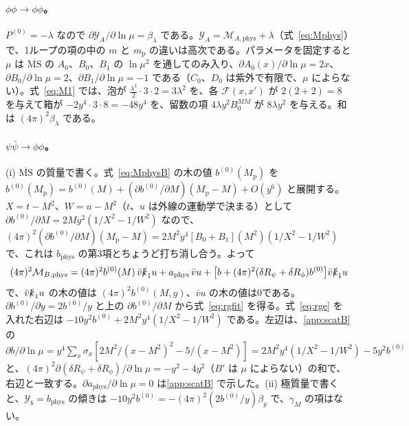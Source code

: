 \documentclass[a4paper,10pt]{ltjsarticle}
\newcommand{\MSbar}{\overline{\mathrm{MS}}}
\begin{document}
\paragraph{$\phi\phi\to\phi\phi$。}$P^{(0)}=-\lambda$ なので $\partial\mathcal Y_A/\partial\ln\mu=\beta_\lambda$ である。$\mathcal Y_A=\mathcal M_{A,\mathrm{phys}}+\lambda$（式~\eqref{eq:Mphys}）で、1ループの項の中の $m$ と $m_{\mathrm p}$ の違いは高次である。パラメータを固定すると $\mu$ は $\MSbar$ の $A_0$、$B_0$、$B_1$ の $\ln\mu^2$ を通してのみ入り、$\partial A_0(x)/\partial\ln\mu=2x$、$\partial B_0/\partial\ln\mu=2$、$\partial B_1/\partial\ln\mu=-1$ である（$C_0$、$D_0$ は紫外で有限で、$\mu$ によらない）。式~\eqref{eq:M1} では、泡が $\frac{\lambda^2}{2}\cdot3\cdot2=3\lambda^2$ を、各 $\mathcal F(x,x')$ が $2(2+2)=8$ を与えて箱が $-2y^4\cdot3\cdot8=-48y^4$ を、留数の項 $4\lambda y^2B_0^{MM}$ が $8\lambda y^2$ を与える。和は $(4\pi)^2\beta_\lambda$ である。

\paragraph{$\psi\bar\psi\to\phi\phi$。}(i) $\MSbar$ の質量で書く。式~\eqref{eq:MphysB} の木の値 $b^{(0)}(M_{\mathrm p})$ を $b^{(0)}(M_{\mathrm p})=b^{(0)}(M)+(\partial b^{(0)}/\partial M)(M_{\mathrm p}-M)+O(y^6)$ と展開する。$X=t-M^2$、$W=u-M^2$（$t$、$u$ は外線の運動学で決まる）として $\partial b^{(0)}/\partial M=2My^2(1/X^2-1/W^2)$ なので、$(4\pi)^2(\partial b^{(0)}/\partial M)(M_{\mathrm p}-M)=2M^2y^4[B_0+B_1](M^2)(1/X^2-1/W^2)$ で、これは $b_{\mathrm{phys}}$ の第3項とちょうど打ち消し合う。よって
\begin{equation*}
(4\pi)^2\mathcal M_{B,\mathrm{phys}}=(4\pi)^2b^{(0)}(M)\,\bar v\slashed k_1u+a_{\mathrm{phys}}\,\bar vu+\bigl[b+(4\pi)^2(\delta R_\psi+\delta R_\phi)b^{(0)}\bigr]\bar v\slashed k_1u
\end{equation*}
で、$\bar v\slashed k_1u$ の木の値は $(4\pi)^2b^{(0)}(M,y)$、$\bar vu$ の木の値は0である。$\partial b^{(0)}/\partial y=2b^{(0)}/y$ と上の $\partial b^{(0)}/\partial M$ から式~\eqref{eq:rgfit} を得る。式~\eqref{eq:rge} を入れた右辺は $-10y^2b^{(0)}+2M^2y^4(1/X^2-1/W^2)$ である。左辺は、\ref{app:scatB} の $\partial b/\partial\ln\mu=y^4\sum_x\sigma_x[2M^2/(x-M^2)^2-5/(x-M^2)]=2M^2y^4(1/X^2-1/W^2)-5y^2b^{(0)}$ と、$(4\pi)^2\partial(\delta R_\psi+\delta R_\phi)/\partial\ln\mu=-y^2-4y^2$（$B'$ は $\mu$ によらない）の和で、右辺と一致する。$\partial a_{\mathrm{phys}}/\partial\ln\mu=0$ は\ref{app:scatB} で示した。(ii) 極質量で書くと、$\mathcal Y_b=b_{\mathrm{phys}}$ の傾きは $-10y^2b^{(0)}=-(4\pi)^2(2b^{(0)}/y)\beta_y$ で、$\gamma_M$ の項はない。
\end{document}
